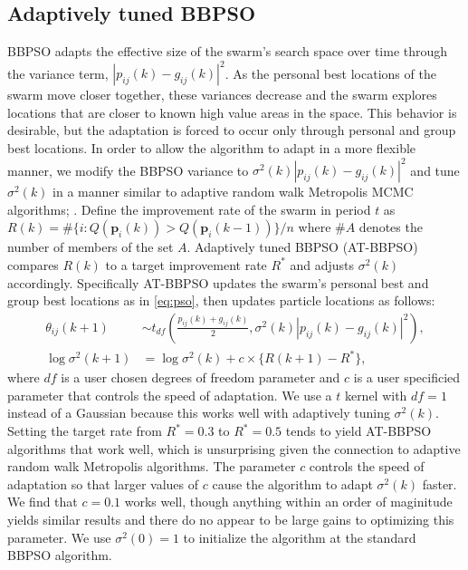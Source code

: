 \documentclass[cmbright]{staauth}
\begin{document}
\subsection{Adaptively tuned BBPSO}\label{subsec:ATBBPSO}
BBPSO adapts the effective size of the swarm's search space over time through the variance term, $|p_{ij}(k) - g_{ij}(k)|^2$. As the personal best locations of the swarm move closer together, these variances decrease and the swarm explores locations that are closer to known high value areas in the space. This behavior is desirable, but the adaptation is forced to occur only through personal and group best locations. In order to allow the algorithm to adapt in a more flexible manner, we modify the BBPSO variance to $\sigma^2(k)|p_{ij}(k) - g_{ij}(k)|^2$ and tune $\sigma^2(k)$ in a manner similar to adaptive random walk Metropolis MCMC algorithms; \cite{andrieu2008tutorial}. Define the improvement rate of the swarm in period $t$ as $R(k) = \#\{i:Q(\bm{p}_i(k))> Q(\bm{p}_i(k-1))\}/n$ where $\#A$ denotes the number of members of the set $A$. Adaptively tuned BBPSO (AT-BBPSO) compares $R(k)$ to a target improvement rate $R^*$ and adjusts $\sigma^2(k)$ accordingly. Specifically AT-BBPSO updates the swarm's personal best and group best locations as in \eqref{eq:pso}, then updates particle locations as follows:
\begin{align}\label{eq:at-bbpso}
\theta_{ij}(k+1) &\sim t_{df}\left(\frac{p_{ij}(k) + g_{ij}(k)}{2}, \sigma^2(k)|p_{ij}(k) - g_{ij}(k)|^2\right),\nonumber\\
\log \sigma^2(k+1) &= \log\sigma^2(k) + c\times\{R(k+1) - R^*\},
\end{align}
where $df$ is a user chosen degrees of freedom parameter and $c$ is a user specificied parameter that controls the speed of adaptation. We use a $t$ kernel with $df=1$ instead of a Gaussian because this works well with adaptively tuning $\sigma^2(k)$. Setting the target rate from $R^*=0.3$ to $R^*=0.5$ tends to yield AT-BBPSO algorithms that work well, which is unsurprising given the connection to adaptive random walk Metropolis algorithms. The parameter $c$ controls the speed of adaptation so that larger values of $c$ cause the algorithm to adapt $\sigma^2(k)$ faster. We find that $c=0.1$ works well, though anything within an order of maginitude yields similar results and there do no appear to be large gains to optimizing this parameter. We use $\sigma^2(0)=1$ to initialize the algorithm at the standard BBPSO algorithm. %
\end{document}
